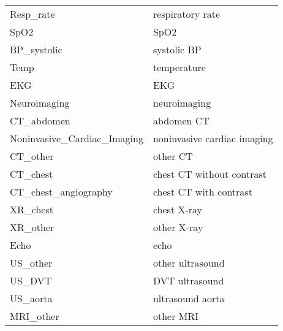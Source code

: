 \begin{tabular}{ll}
Resp\_rate & respiratory rate \\
SpO2 & SpO2 \\
BP\_systolic & systolic BP \\
Temp & temperature \\
EKG & EKG \\
Neuroimaging & neuroimaging \\
CT\_abdomen & abdomen CT \\
Noninvasive\_Cardiac\_Imaging & noninvasive cardiac imaging \\
CT\_other & other CT \\
CT\_chest & chest CT without contrast \\
CT\_chest\_angiography & chest CT with contrast \\
XR\_chest & chest X-ray \\
XR\_other & other X-ray \\
Echo & echo \\
US\_other & other ultrasound \\
US\_DVT & DVT ultrasound \\
US\_aorta & ultrasound aorta \\
MRI\_other & other MRI \\
\bottomrule
\end{tabular}
